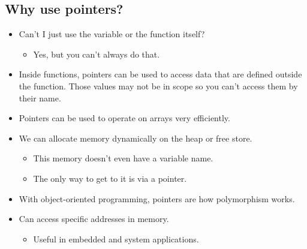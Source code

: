 \subsection{Why use pointers?}
\begin{itemize}
    \item Can't I just use the variable or the function itself?
        \begin{itemize}
            \item Yes, but you can't always do that.
        \end{itemize}
    
    \item Inside functions, pointers can be used to access data that are defined outside the function. Those values may not be in scope so you can't access them by their name.
    \item Pointers can be used to operate on arrays very efficiently.
    \item We can allocate memory dynamically on the heap or free store.
        \begin{itemize}
            \item This memory doesn't even have a variable name.
            \item The only way to get to it is via a pointer.
        \end{itemize}
    
    \item With object-oriented programming,  pointers are how polymorphism works.
    \item Can access specific addresses in memory.
        \begin{itemize}
            \item Useful in embedded and system applications.
        \end{itemize}
\end{itemize}


